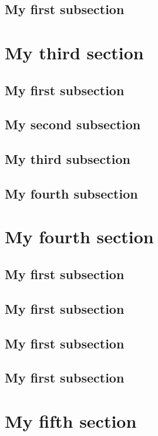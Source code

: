 \documentclass[fontsize=10pt,open=any,twocolumn]{scrbook}%
\begin{document}
            \subsection{My first subsection}
                \blindtext    
        \section{My third section}
                \blindtext
            \subsection{My first subsection}
                \blindtext
            \subsection{My second subsection}
                \blindtext     
            \subsection{My third subsection}
                \blindtext
            \subsection{My fourth subsection}
                \blindtext       
        \section{My fourth section}
                \blindtext
            \subsection{My first subsection}
                \blindtext
            \subsection{My first subsection}
                \blindtext     
            \subsection{My first subsection}
                \blindtext
            \subsection{My first subsection}
                \blindtext    
        \section{My fifth section}
                \blindtext
\end{document}
